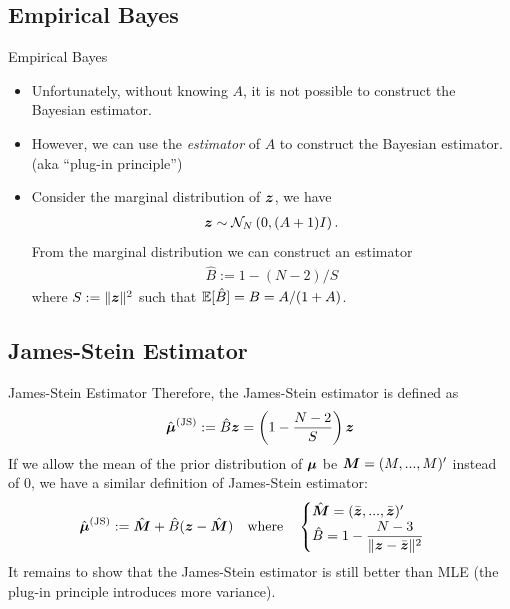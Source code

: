 \documentclass{beamer}
\begin{document}
\subsection{Empirical Bayes}

\begin{frame}{Empirical Bayes}
	\begin{itemize}
		\item
			Unfortunately,
			without knowing $A$,
			it is not possible to construct the Bayesian estimator.
		\item
			However, we can use the \emph{estimator} of $A$ to construct the
			Bayesian estimator. (aka ``plug-in principle'')
		\item
			Consider the marginal distribution of $\bfz$,
			we have
			\begin{align*}
				\bfz \sim \normal[N]{0,(A+1)I}.
			\end{align*}
			From the marginal distribution we can construct an estimator
			\begin{align*}
				\hat{B} := 1-(N-2)/S
			\end{align*}
			where $S:=\|\bfz\|^2$ such that $\Exp[\hat{B}]=B=A/(1+A)$.
	\end{itemize}
\end{frame}

\subsection{James-Stein Estimator}

\begin{frame}{James-Stein Estimator}
	Therefore, the James-Stein estimator is defined as
	\begin{align*}
		\hat{\bfmu}^{\text{(JS)}} := \hat{B}\bfz
		= \left(1-\frac{N-2}{S}\right)\bfz
	\end{align*}
	If we allow the mean of the prior distribution of $\bfmu$ be
	$\bfM=(M,...,M)'$ instead of $0$,
	we have a similar definition of James-Stein estimator:
	\begin{align*}
		\hat{\bfmu}^{\text{(JS)}}
		:= \hat{\bfM} + \hat{B}(\bfz-\hat{\bfM})
		\quad\text{where}\quad
		\begin{cases}
			\hat{\bfM} = (\bar{\bfz},...,\bar{\bfz})' \\
			\hat{B}    = 1 - \dfrac{N-3}{\|\bfz-\bar{\bfz}\|^2}
		\end{cases}
	\end{align*}
	It remains to show that the James-Stein estimator is still better
	than MLE (the plug-in principle introduces more variance).
\end{frame}
\end{document}
